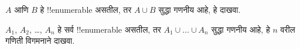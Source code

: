 \documentclass[../../../include/open-logic-section]{subfiles}
\begin{document}
\begin{prob}
$A$ आणि $B$ हे !!{enumerable} असतील, तर $A \cup B$ सुद्धा गणनीय
आहे, हे दाखवा.
\end{prob}

\begin{prob}
$A_1$, $A_2$, \dots, $A_n$ हे सर्व !!{enumerable} असतील, तर
$A_1 \cup \dots \cup A_n$ सुद्धा गणनीय आहे, हे $n$ वरील गणिती विगमनाने
दाखवा.
\end{prob}
\end{document}
